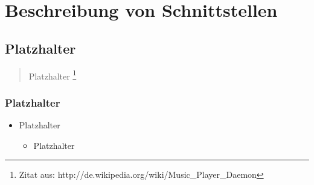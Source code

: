 \chapter{Beschreibung von Schnittstellen}

\section{Platzhalter}

\begin{quote}
Platzhalter
\footnote{Zitat aus: http://de.wikipedia.org/wiki/Music\_Player\_Daemon}
\end{quote}

\newpage
\subsection{Platzhalter}

\renewcommand{\labelitemi}{•}
\begin{itemize}
	\item Platzhalter
	
	\renewcommand{\labelitemi}{--}
	\begin{itemize}
		\item Platzhalter
	\end{itemize}
\end{itemize}
